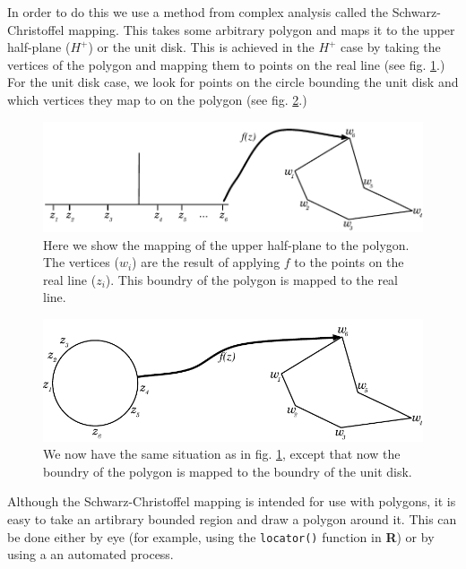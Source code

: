 \documentclass[a4paper,10pt]{amsart}
\newcommand{\sch}{Schwarz-Christoffel }
\begin{document}
In order to do this we use a method from complex analysis called the \sch mapping. This takes some arbitrary polygon and maps it to the upper half-plane ($H^+$) or the unit disk. This is achieved in the $H^+$ case by taking the vertices of the polygon and mapping them to points on the real line (see fig. \ref{reallinedia}.) For the unit disk case, we look for points on the circle bounding the unit disk and which vertices they map to on the polygon (see fig. \ref{unitdiskdia}.)

\begin{figure} [tbp]
\centering
\includegraphics[scale=0.6]{figs/reallinedia.pdf}
\caption{Here we show the mapping of the upper half-plane to the polygon. The vertices ($w_i$) are the result of applying $f$ to the points on the real line ($z_i$). This boundry of the polygon is mapped to the real line.}
\label{reallinedia}
\end{figure}

\begin{figure} [tbp]
\centering
\includegraphics[scale=0.6]{figs/unitdiskdia.pdf}
\caption{We now have the same situation as in fig. \ref{reallinedia}, except that now the boundry of the polygon is mapped to the boundry of the unit disk.}
\label{unitdiskdia}
\end{figure}




Although the \sch mapping is intended for use with polygons, it is easy to take an artibrary bounded region and draw a polygon around it. This can be done either by eye (for example, using the \texttt{locator()} function in \textbf{R}) or by using a an automated process.
\end{document}
